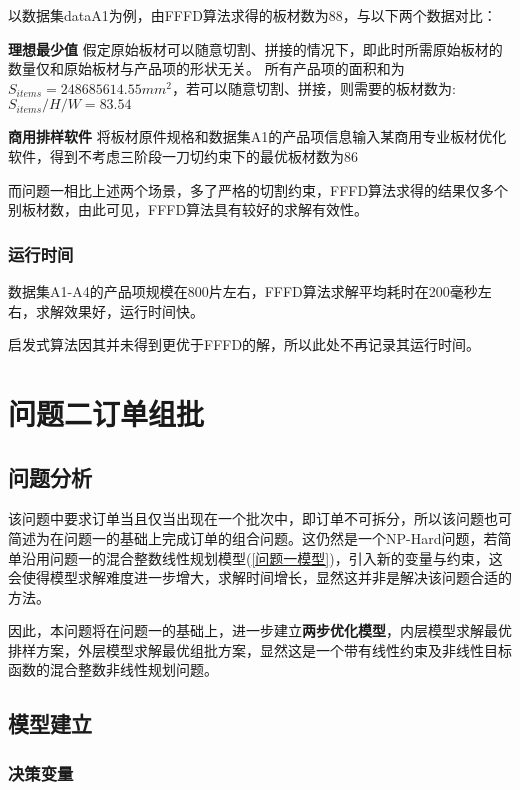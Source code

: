 \documentclass[bwprint]{gmcmthesis}
\begin{document}
	以数据集dataA1为例，由FFFD算法求得的板材数为88，与以下两个数据对比：
	
	\textbf{理想最少值} \quad 假定原始板材可以随意切割、拼接的情况下，即此时所需原始板材的数量仅和原始板材与产品项的形状无关。 所有产品项的面积和为 $ S_{items} = 248685614.55 mm^2 $，若可以随意切割、拼接，则需要的板材数为: $ S_{items}/H/W =  83.54 $
	
	\textbf{商用排样软件} \quad 将板材原件规格和数据集A1的产品项信息输入某商用专业板材优化软件，得到不考虑三阶段一刀切约束下的最优板材数为86
	
	而问题一相比上述两个场景，多了严格的切割约束，FFFD算法求得的结果仅多个别板材数，由此可见，FFFD算法具有较好的求解有效性。

	
\subsubsection{运行时间}
	 
	数据集A1-A4的产品项规模在800片左右，FFFD算法求解平均耗时在200毫秒左右，求解效果好，运行时间快。
    
    启发式算法因其并未得到更优于FFFD的解，所以此处不再记录其运行时间。
		


\section{问题二订单组批}

\subsection{问题分析}
该问题中要求订单当且仅当出现在一个批次中，即订单不可拆分，所以该问题也可简述为在问题一的基础上完成订单的组合问题。这仍然是一个NP-Hard问题，若简单沿用问题一的混合整数线性规划模型(\ref{问题一模型})，引入新的变量与约束，这会使得模型求解难度进一步增大，求解时间增长，显然这并非是解决该问题合适的方法。

因此，本问题将在问题一的基础上，进一步建立\textbf{两步优化模型}，内层模型求解最优排样方案，外层模型求解最优组批方案，显然这是一个带有线性约束及非线性目标函数的混合整数非线性规划问题。

\subsection{模型建立}


\subsubsection{决策变量}
\end{document}

